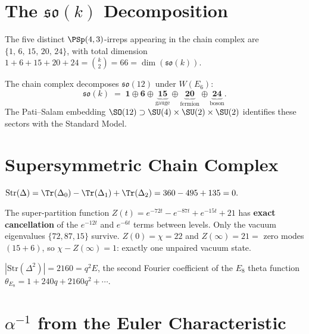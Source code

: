 \section{\texorpdfstring{The $\mathfrak{so}(k)$ Decomposition}{The so(k) Decomposition}}

\begin{theorem}
The five distinct $\PSp(4,3)$-irreps appearing in the chain complex
are $\{1,\,6,\,15,\,20,\,24\}$, with total dimension
$1+6+15+20+24 = \binom{k}{2} = 66 = \dim(\mathfrak{so}(k))$.
\end{theorem}

The chain complex decomposes $\mathfrak{so}(12)$ under $W(E_6)$:
\begin{equation}
\mathfrak{so}(k) \;=\; \mathbf{1} \oplus \mathbf{6} \oplus
\underbrace{\mathbf{15}}_{\mathrm{gauge}} \oplus
\underbrace{\mathbf{20}}_{\mathrm{fermion}} \oplus
\underbrace{\mathbf{24}}_{\mathrm{boson}}.
\end{equation}
The Pati--Salam embedding $\SO(12)\supset\SU(4)\times\SU(2)\times\SU(2)$
identifies these sectors with the Standard Model.


\section{Supersymmetric Chain Complex}

\begin{theorem}
$\mathrm{Str}(\Delta) = \Tr(\Delta_0) - \Tr(\Delta_1) + \Tr(\Delta_2)
= 360 - 495 + 135 = 0.$
\end{theorem}

The super-partition function
$Z(t) = e^{-72t} - e^{-87t} + e^{-15t} + 21$
has \textbf{exact cancellation} of the $e^{-12t}$ and $e^{-6t}$ terms
between levels. Only the vacuum eigenvalues $\{72,87,15\}$ survive.
$Z(0) = \chi = 22$ and $Z(\infty) = 21 = $ zero modes $(15+6)$,
so $\chi - Z(\infty) = 1$: exactly one unpaired vacuum state.

\begin{theorem}
$|\mathrm{Str}(\Delta^2)| = 2160 = q^2 E$, the second Fourier coefficient
of the $E_8$ theta function $\theta_{E_8} = 1 + 240q + 2160q^2 + \cdots$.
\end{theorem}


\section{\texorpdfstring{$\alpha^{-1}$ from the Euler Characteristic}{alpha^-1 from the Euler Characteristic}}

